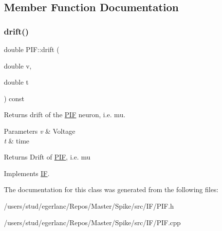 \subsection{Member Function Documentation}
\mbox{\label{classPIF_a12aaacff008d1366ddb6fc3ca0e3ed51}} 
\subsubsection{\texorpdfstring{drift()}{drift()}}
{\footnotesize\ttfamily double P\+I\+F\+::drift (\begin{DoxyParamCaption}\item[{double}]{v,  }\item[{double}]{t }\end{DoxyParamCaption}) const\hspace{0.3cm}{\ttfamily [virtual]}}



Returns drift of the \hyperlink{classPIF}{P\+IF} neuron, i.\+e. mu. 


\begin{DoxyParams}{Parameters}
{\em v} & Voltage \\
\hline
{\em t} & time \\
\hline
\end{DoxyParams}
\begin{DoxyReturn}{Returns}
Drift of \hyperlink{classPIF}{P\+IF}, i.\+e. mu 
\end{DoxyReturn}


Implements \hyperlink{classIF_aa8a7a38f8fa3aa013df026734d02784c}{IF}.



The documentation for this class was generated from the following files\+:\begin{DoxyCompactItemize}
\item 
/users/stud/egerlanc/\+Repos/\+Master/\+Spike/src/\+I\+F/P\+I\+F.\+h\item 
/users/stud/egerlanc/\+Repos/\+Master/\+Spike/src/\+I\+F/P\+I\+F.\+cpp\end{DoxyCompactItemize}

